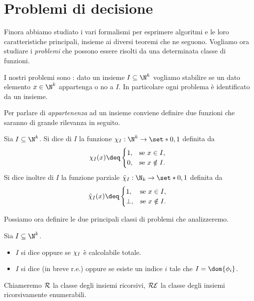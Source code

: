 \section{Problemi di decisione}

Finora abbiamo studiato i vari formalismi per esprimere algoritmi e le loro caratteristiche principali, insieme ai diversi teoremi che ne seguono. Vogliamo ora studiare i \emph{problemi} che possono essere risolti da una determinata classe di funzioni.

I nostri problemi sono : dato un insieme $I \subseteq \N^k$ vogliamo stabilire se un dato elemento $x \in \N^k$ appartenga o no a $I$. In particolare ogni problema è identificato da un insieme.

Per parlare di \emph{appartenenza} ad un insieme conviene definire due funzioni che saranno di grande rilevanza in seguito.

\begin{definition}
    Sia $I \subseteq \N^k$. 
    Si dice  di $I$ la funzione 
    $\charf{I} : \N^k \to \set*{0,1}$ definita da \[
        \charf{I}(x) \deq \begin{cases}
            1, &\text{se } x \in I,\\
            0, &\text{se } x \notin I.
        \end{cases}
    \] Si dice inoltre  di $I$ la funzione parziale $\scharf{I} : \N_k \to \set*{0, 1}$ definita da \[
        \scharf{I}(x) \deq \begin{cases}
            1, &\text{se } x \in I,\\
            \bot, &\text{se } x \notin I.
        \end{cases}
    \]
\end{definition}

Possiamo ora definire le due principali classi di problemi che analizzeremo.

\begin{definition}
    Sia $I \subseteq \N^k$. \begin{itemize}
        \item $I$ si dice  oppure  se $\chi_{I}$ è calcolabile totale.
        \item $I$ si dice  (in breve r.e.) oppure  se esiste un indice $i$ tale che $I = \dom{\phi_i}$.   
    \end{itemize}
    Chiameremo $\mathcal{R}$ la classe degli insiemi ricorsivi, $\mathcal{RE}$ la classe degli insiemi ricorsivamente enumerabili.
\end{definition}

